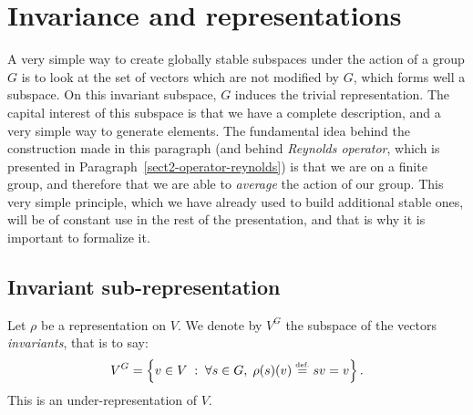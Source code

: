 \section{Invariance and representations}
 
 A very simple way to create globally stable subspaces under the action of a group $G$ is to look at the set of vectors which are not modified by $G$, which forms well a subspace. On this invariant subspace, $G$ induces the trivial representation. The capital interest of this subspace is that we have a complete description, and a very simple way to generate elements. The fundamental idea behind the construction made in this paragraph (and behind \textit{Reynolds operator}, which is presented in Paragraph~\ref{sect2-operator-reynolds}) is that we are on a finite group, and therefore that we are able to \textit{average} the action of our group. This very simple principle, which we have already used to build additional stable ones, will be of constant use in the rest of the presentation, and that is why it is important to formalize it.
\subsection{Invariant sub-representation}
\label{sect2-invariance-representation}
 
 
\begin{defn}
\label{defn-sub-invariant}
\label{notation-80} Let $ \rho $ be a representation on $V$. We denote by $ V^G $ the subspace of the vectors \textit{invariants}, that is to say:
\begin{equation*}
V^G = \left\{ v \in V \;:\; \forall s \in G, \; \rho (s) (v) \stackrel{\mbox{\upshape\tiny def.}}{=} sv = v \right\}.
\end{equation*}
This is an under-representation of $V$.
\end{defn}
 
